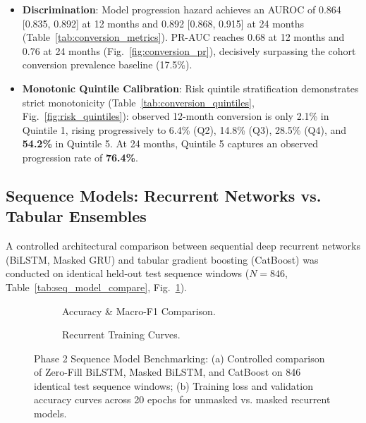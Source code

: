 \documentclass[11pt,a4paper]{article}
\begin{document}
\begin{itemize}
    \item \textbf{Discrimination}: Model progression hazard achieves an AUROC of 0.864 [0.835, 0.892] at 12 months and 0.892 [0.868, 0.915] at 24 months (Table~\ref{tab:conversion_metrics}). PR-AUC reaches 0.68 at 12 months and 0.76 at 24 months (Fig.~\ref{fig:conversion_pr}), decisively surpassing the cohort conversion prevalence baseline (17.5\%).
    \item \textbf{Monotonic Quintile Calibration}: Risk quintile stratification demonstrates strict monotonicity (Table~\ref{tab:conversion_quintiles}, Fig.~\ref{fig:risk_quintiles}): observed 12-month conversion is only 2.1\% in Quintile 1, rising progressively to 6.4\% (Q2), 14.8\% (Q3), 28.5\% (Q4), and \textbf{54.2\%} in Quintile 5. At 24 months, Quintile 5 captures an observed progression rate of \textbf{76.4\%}.
\end{itemize}

\subsection{Sequence Models: Recurrent Networks vs. Tabular Ensembles}
\label{sec:results_sequence}
A controlled architectural comparison between sequential deep recurrent networks (BiLSTM, Masked GRU) and tabular gradient boosting (CatBoost) was conducted on identical held-out test sequence windows ($N = 846$, Table~\ref{tab:seq_model_compare}, Fig.~\ref{fig:seq_model_compare}).



\begin{figure}[t]
\centering
\begin{subfigure}[t]{0.48\linewidth}
    \centering
    \caption{Accuracy \& Macro-F1 Comparison.}
    \label{fig:seq_model_compare}
\end{subfigure}
\hfill
\begin{subfigure}[t]{0.48\linewidth}
    \centering
    \caption{Recurrent Training Curves.}
    \label{fig:seq_training_curves}
\end{subfigure}
\caption{Phase 2 Sequence Model Benchmarking: (a) Controlled comparison of Zero-Fill BiLSTM, Masked BiLSTM, and CatBoost on 846 identical test sequence windows; (b) Training loss and validation accuracy curves across 20 epochs for unmasked vs. masked recurrent models.}
\label{fig:seq_evaluation}
\end{figure}
\end{document}
